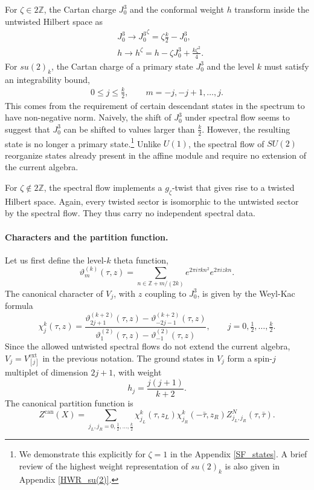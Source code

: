 \documentclass[11pt]{article}
\numberwithin{equation}{section}
\begin{document}
For $\zeta\in 2\mathbb{Z}$, the Cartan charge $J^3_0$ and the conformal weight $h$ transform inside the untwisted Hilbert space as
\begin{align}
    &J^3_0 \rightarrow {J_0^3}^\zeta= \zeta\frac{k}{2}- J_0^3, \\
    &h \rightarrow h^{\zeta}= h-\zeta J_0^3+\frac{k\zeta^2}{4}.
\end{align}
For $su(2)_k$, the Cartan charge of a primary state $J_0^3$ and the level $k$ must satisfy an integrability bound,
\begin{align}
    0\le j\le\frac{k}{2},\qquad m=-j,-j+1,\ldots,j.
\end{align}
This comes from the requirement of certain descendant states in the spectrum to have non-negative norm. Naively, the shift of $J_0^3$ under spectral flow seems to suggest that $J_0^3$ can be shifted to values larger than $\frac{k}{2}$. However, the resulting state is no longer a primary state.\footnote{We demonstrate this explicitly for $\zeta=1$ in the Appendix \ref{SF_states}. A brief review of the highest weight representation of $su(2)_k$  is also given in Appendix \ref{HWR_su(2)}.}
Unlike $U(1)$, the spectral flow of $SU(2)$ reorganize states already present in the affine module and require no extension of the current algebra.

For $\zeta\notin 2\mathbb{Z}$, the spectral flow implements a $g_{\zeta}$-twist that gives rise to a twisted Hilbert space. Again, every twisted sector is isomorphic to the untwisted sector by the spectral flow. They thus carry no independent spectral data.


\paragraph{Characters and the partition function.}
Let us first define the level-$k$ theta function,
\begin{equation}
\vartheta_m^{(k)}(\tau,z)
 =\sum_{n\in\mathbb Z+m/(2k)}e^{2\pi i\tau kn^2}e^{2\pi izkn}.
\end{equation}
The canonical character of $V_j$, with $z$ coupling to $J_0^3$, is given by the Weyl-Kac formula
\begin{equation}
\chi_j^k(\tau,z)
 =\frac{\vartheta_{2j+1}^{(k+2)}(\tau,z)-\vartheta_{-2j-1}^{(k+2)}(\tau,z)}
 {\vartheta_1^{(2)}(\tau,z)-\vartheta_{-1}^{(2)}(\tau,z)},
\qquad j=0,\tfrac12,\ldots,\tfrac k2.
\label{su(2)-char}
\end{equation}
Since the allowed untwisted spectral flows do not extend the current algebra, $V_j=V^{\mathrm{ext}}_{[j]}$ in the previous notation. The ground states in $V_j$ form a spin-$j$ multiplet of dimension $2j+1$, with weight
\begin{equation}
h_j=\frac{j(j+1)}{k+2}.
\label{eq:su2-hm}
\end{equation}
The canonical partition function is
\begin{equation}
Z^{\mathrm{can}}(X)
 =\sum_{j_L,j_R=0,\frac12,\ldots,\frac k2}
 \chi_{j_L}^k(\tau,z_L)\chi_{j_R}^k(-\bar\tau,z_R)
 Z^N_{j_L,j_R}(\tau,\bar\tau).
\label{eq:SU2-dressing}
\end{equation}
\end{document}
